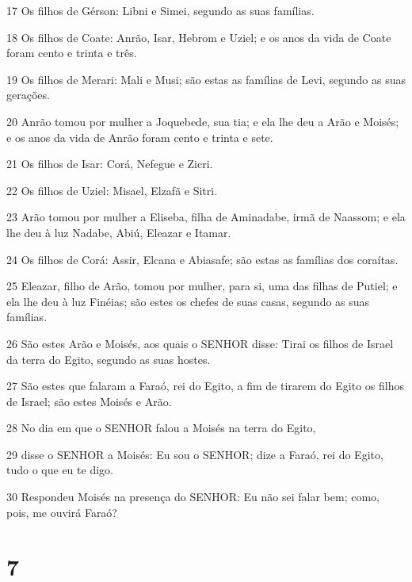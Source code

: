 \par 17 Os filhos de Gérson: Libni e Simei, segundo as suas famílias.
\par 18 Os filhos de Coate: Anrão, Isar, Hebrom e Uziel; e os anos da vida de Coate foram cento e trinta e três.
\par 19 Os filhos de Merari: Mali e Musi; são estas as famílias de Levi, segundo as suas gerações.
\par 20 Anrão tomou por mulher a Joquebede, sua tia; e ela lhe deu a Arão e Moisés; e os anos da vida de Anrão foram cento e trinta e sete.
\par 21 Os filhos de Isar: Corá, Nefegue e Zicri.
\par 22 Os filhos de Uziel: Misael, Elzafã e Sitri.
\par 23 Arão tomou por mulher a Eliseba, filha de Aminadabe, irmã de Naassom; e ela lhe deu à luz Nadabe, Abiú, Eleazar e Itamar.
\par 24 Os filhos de Corá: Assir, Elcana e Abiasafe; são estas as famílias dos coraítas.
\par 25 Eleazar, filho de Arão, tomou por mulher, para si, uma das filhas de Putiel; e ela lhe deu à luz Finéias; são estes os chefes de suas casas, segundo as suas famílias.
\par 26 São estes Arão e Moisés, aos quais o SENHOR disse: Tirai os filhos de Israel da terra do Egito, segundo as suas hostes.
\par 27 São estes que falaram a Faraó, rei do Egito, a fim de tirarem do Egito os filhos de Israel; são estes Moisés e Arão.
\par 28 No dia em que o SENHOR falou a Moisés na terra do Egito,
\par 29 disse o SENHOR a Moisés: Eu sou o SENHOR; dize a Faraó, rei do Egito, tudo o que eu te digo.
\par 30 Respondeu Moisés na presença do SENHOR: Eu não sei falar bem; como, pois, me ouvirá Faraó?

\chapter{7}

